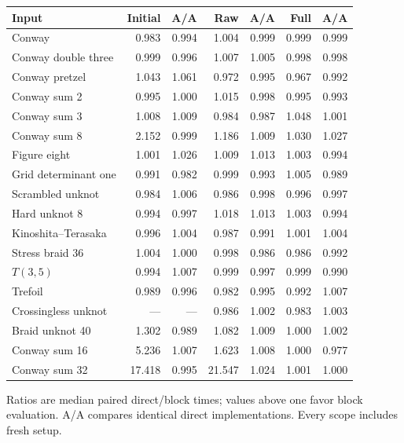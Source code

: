 \begin{center}\small
\begin{tabular}{@{}lrrrrrr@{}}
\toprule
Input & Initial & A/A & Raw & A/A & Full & A/A \\
\midrule
Conway & 0.983 & 0.994 & 1.004 & 0.999 & 0.999 & 0.999 \\
Conway double three & 0.999 & 0.996 & 1.007 & 1.005 & 0.998 & 0.998 \\
Conway pretzel & 1.043 & 1.061 & 0.972 & 0.995 & 0.967 & 0.992 \\
Conway sum 2 & 0.995 & 1.000 & 1.015 & 0.998 & 0.995 & 0.993 \\
Conway sum 3 & 1.008 & 1.009 & 0.984 & 0.987 & 1.048 & 1.001 \\
Conway sum 8 & 2.152 & 0.999 & 1.186 & 1.009 & 1.030 & 1.027 \\
Figure eight & 1.001 & 1.026 & 1.009 & 1.013 & 1.003 & 0.994 \\
Grid determinant one & 0.991 & 0.982 & 0.999 & 0.993 & 1.005 & 0.989 \\
Scrambled unknot & 0.984 & 1.006 & 0.986 & 0.998 & 0.996 & 0.997 \\
Hard unknot 8 & 0.994 & 0.997 & 1.018 & 1.013 & 1.003 & 0.994 \\
Kinoshita--Terasaka & 0.996 & 1.004 & 0.987 & 0.991 & 1.001 & 1.004 \\
Stress braid 36 & 1.004 & 1.000 & 0.998 & 0.986 & 0.986 & 0.992 \\
$T(3,5)$ & 0.994 & 1.007 & 0.999 & 0.997 & 0.999 & 0.990 \\
Trefoil & 0.989 & 0.996 & 0.982 & 0.995 & 0.992 & 1.007 \\
Crossingless unknot & --- & --- & 0.986 & 1.002 & 0.983 & 1.003 \\
Braid unknot 40 & 1.302 & 0.989 & 1.082 & 1.009 & 1.000 & 1.002 \\
Conway sum 16 & 5.236 & 1.007 & 1.623 & 1.008 & 1.000 & 0.977 \\
Conway sum 32 & 17.418 & 0.995 & 21.547 & 1.024 & 1.001 & 1.000 \\
\bottomrule
\end{tabular}
\end{center}
Ratios are median paired direct/block times; values above one favor block evaluation. A/A compares identical direct implementations. Every scope includes fresh setup.
